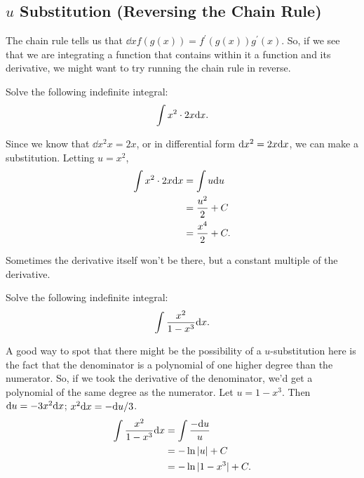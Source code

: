 \subsection{$u$ Substitution (Reversing the Chain Rule)}
The chain rule tells us that $\dd{}{x}f(g(x)) = f^\prime(g(x))g^\prime(x)$.
So, if we see that we are integrating a function that contains within it a function and its derivative, we might want to try running the chain rule in reverse.
\begin{example}
	Solve the following indefinite integral:
	\begin{equation*}
		\int{x^2\cdot 2x\mathrm{d} x}.
	\end{equation*}
\end{example}
Since we know that $\dd{x^2}{x} = 2x$, or in differential form $\mathrm{d} x^2 = 2x\mathrm{d} x$, we can make a substitution.
Letting $u = x^2$,
\begin{align*}
	\int{x^2\cdot 2x\mathrm{d} x} &= \int{u\mathrm{d} u} \\
	&= \frac{u^2}{2} + C \\
	&= \frac{x^4}{2} + C.
\end{align*}

\noindent
Sometimes the derivative itself won't be there, but a constant multiple of the derivative.
\begin{example}
	Solve the following indefinite integral:
	\begin{equation*}
		\int{\frac{x^2}{1-x^3}\mathrm{d} x}.
	\end{equation*}
\end{example}
A good way to spot that there might be the possibility of a $u$-substitution here is the fact that the denominator is a polynomial of one higher degree than the numerator.
So, if we took the derivative of the denominator, we'd get a polynomial of the same degree as the numerator.
Let $u = 1-x^3$.
Then $\mathrm{d} u = -3x^2\mathrm{d} x$; $x^2\mathrm{d} x = -\mathrm{d} u/3$.
\begin{align*}
	\int{\frac{x^2}{1-x^3}\mathrm{d} x} &= \int{\frac{-\mathrm{d} u}{u}} \\
	&= -\ln{\lvert u \rvert} + C \\
	&= -\ln{\lvert 1-x^3 \rvert} + C.
\end{align*}

